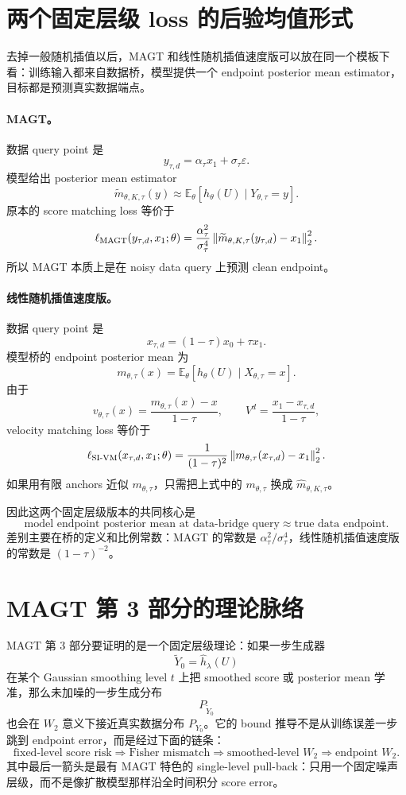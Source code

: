 \documentclass[UTF8,11pt]{ctexart}
\newcommand{\E}{\mathbb{E}}
\begin{document}
\clearpage

\section{两个固定层级 loss 的后验均值形式}

去掉一般随机插值以后，MAGT 和线性随机插值速度版可以放在同一个模板下看：训练输入都来自数据桥，模型提供一个 endpoint posterior mean estimator，目标都是预测真实数据端点。

\paragraph{MAGT。}
数据 query point 是
\[
y_{\tau,d}=\alpha_\tau x_1+\sigma_\tau\varepsilon.
\]
模型给出 posterior mean estimator
\[
\widetilde m_{\theta,K,\tau}(y)
\approx
\E_\theta[h_\theta(U)\mid Y_{\theta,\tau}=y].
\]
原本的 score matching loss 等价于
\[
\ell_{\rm MAGT}(y_{\tau,d},x_1;\theta)
=
\frac{\alpha_\tau^2}{\sigma_\tau^4}
\left\|
\widetilde m_{\theta,K,\tau}(y_{\tau,d})-x_1
\right\|_2^2.
\]
所以 MAGT 本质上是在 noisy data query 上预测 clean endpoint。

\paragraph{线性随机插值速度版。}
数据 query point 是
\[
x_{\tau,d}=(1-\tau)x_0+\tau x_1.
\]
模型桥的 endpoint posterior mean 为
\[
m_{\theta,\tau}(x)
=
\E_\theta[h_\theta(U)\mid X_{\theta,\tau}=x].
\]
由于
\[
v_{\theta,\tau}(x)=\frac{m_{\theta,\tau}(x)-x}{1-\tau},
\qquad
V^d=\frac{x_1-x_{\tau,d}}{1-\tau},
\]
velocity matching loss 等价于
\[
\ell_{\rm SI\text{-}VM}(x_{\tau,d},x_1;\theta)
=
\frac{1}{(1-\tau)^2}
\left\|
m_{\theta,\tau}(x_{\tau,d})-x_1
\right\|_2^2.
\]
如果用有限 anchors 近似 \(m_{\theta,\tau}\)，只需把上式中的 \(m_{\theta,\tau}\) 换成
\(\widehat m_{\theta,K,\tau}\)。

因此这两个固定层级版本的共同核心是
\[
\boxed{
\text{model endpoint posterior mean at data-bridge query}
\approx
\text{true data endpoint}.
}
\]
差别主要在桥的定义和比例常数：MAGT 的常数是 \(\alpha_\tau^2/\sigma_\tau^4\)，线性随机插值速度版的常数是 \((1-\tau)^{-2}\)。

\section{MAGT 第 3 部分的理论脉络}

MAGT 第 3 部分要证明的是一个固定层级理论：如果一步生成器
\[
\widetilde Y_0=\hat h_\lambda(U)
\]
在某个 Gaussian smoothing level \(t\) 上把 smoothed score 或 posterior mean 学准，那么未加噪的一步生成分布
\[
P_{\widetilde Y_0}
\]
也会在 \(W_2\) 意义下接近真实数据分布 \(P_{Y_0}\)。它的 bound 推导不是从训练误差一步跳到 endpoint error，而是经过下面的链条：
\[
\text{fixed-level score risk}
\Longrightarrow
\text{Fisher mismatch}
\Longrightarrow
\text{smoothed-level } W_2
\Longrightarrow
\text{endpoint } W_2 .
\]
其中最后一箭头是最有 MAGT 特色的 single-level pull-back：只用一个固定噪声层级，而不是像扩散模型那样沿全时间积分 score error。
\end{document}
